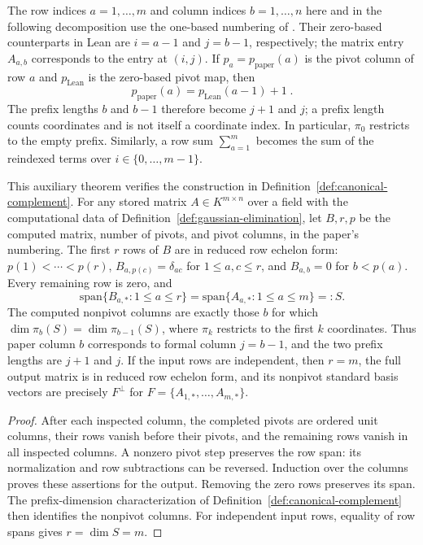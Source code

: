 The row indices $a=1,\ldots,m$ and column indices $b=1,\ldots,n$ here and
in the following decomposition use the one-based numbering of
\cite{Ji2020MIPStar}. Their zero-based counterparts in Lean are $i=a-1$ and
$j=b-1$, respectively; the matrix entry $A_{a,b}$ corresponds to the entry
at $(i,j)$. If $p_a=p_{\mathrm{paper}}(a)$ is the pivot column of row $a$
and $p_{\mathrm{Lean}}$ is the zero-based pivot map, then
\[
  p_{\mathrm{paper}}(a)=p_{\mathrm{Lean}}(a-1)+1\;.
\]
The prefix lengths $b$ and $b-1$ therefore become $j+1$ and $j$; a prefix
length counts coordinates and is not itself a coordinate index. In particular,
$\pi_0$ restricts to the empty prefix. Similarly, a row sum
$\sum_{a=1}^m$ becomes the sum of the reindexed terms over
$i\in\{0,\ldots,m-1\}$.

\begin{theorem}\label{thm:gaussian-elimination-correct}
  \leanok
  This auxiliary theorem verifies the construction in
  Definition~\ref{def:canonical-complement}. For any stored matrix
  $A\in K^{m\times n}$ over a field with the computational data of
  Definition~\ref{def:gaussian-elimination}, let $B,r,p$ be the computed
  matrix, number of pivots, and pivot columns, in the paper's numbering.
  The first $r$ rows of $B$ are in reduced row echelon form:
  $p(1)<\cdots<p(r)$, $B_{a,p(c)}=\delta_{ac}$ for $1\leq a,c\leq r$,
  and $B_{a,b}=0$ for $b<p(a)$. Every remaining row is zero, and
  \[
    \mathrm{span}\{B_{a,*}:1\leq a\leq r\}
      =\mathrm{span}\{A_{a,*}:1\leq a\leq m\}=:S.
  \]
  The computed nonpivot columns are exactly those $b$ for which
  $\dim\pi_b(S)=\dim\pi_{b-1}(S)$, where $\pi_k$ restricts to the first
  $k$ coordinates. Thus paper column $b$ corresponds to formal column
  $j=b-1$, and the two prefix lengths are $j+1$ and $j$.
  If the input rows are independent, then $r=m$, the full output matrix
  is in reduced row echelon form, and its nonpivot standard basis vectors
  are precisely $F^\perp$ for $F=\{A_{1,*},\ldots,A_{m,*}\}$.
\end{theorem}
\begin{proof}
  \leanok
  After each inspected column, the completed pivots are ordered unit
  columns, their rows vanish before their pivots, and the remaining rows
  vanish in all inspected columns. A nonzero pivot step preserves the row
  span: its normalization and row subtractions can be reversed. Induction
  over the columns proves these assertions for the output. Removing the
  zero rows preserves its span. The prefix-dimension characterization of
  Definition~\ref{def:canonical-complement} then identifies the nonpivot
  columns. For independent input rows, equality of row spans gives
  $r=\dim S=m$.
\end{proof}

